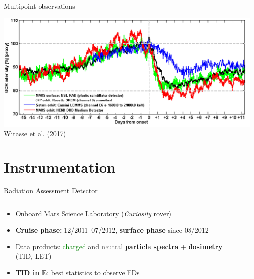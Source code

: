 \documentclass[10pt,aspectratio=169,usenames,dvipsnames]{beamer}
\begin{document}
\begin{frame}{Multipoint observations}
    \vskip0.2cm
    \begin{center}
        \includegraphics[width=0.8\linewidth]{images/witasse2017.png}\\
        \footnotesize Witasse et al. (2017)
    \end{center}
\end{frame}

\section{Instrumentation}

\begin{frame}{Radiation Assessment Detector}
    \begin{columns}
        \begin{column}{0.50\textwidth}
            \begin{itemize}
                \item Onboard Mars Science Laboratory (\emph{Curiosity} rover)
                \item \textbf{Cruise phase:} 12/2011--07/2012,
                \textbf{surface phase} since 08/2012
                \item Data products: \textcolor{green}{charged} and \textcolor{gray}{neutral} \textbf{particle spectra} + \textbf{dosimetry} (TID, LET)
                \item \textbf{TID in E}: best statistics to observe FDs
            \end{itemize}
            
            
        \end{column}
        \begin{column}{0.40\textwidth}
            
        \end{column}
    \end{columns}
\end{frame}
\end{document}
